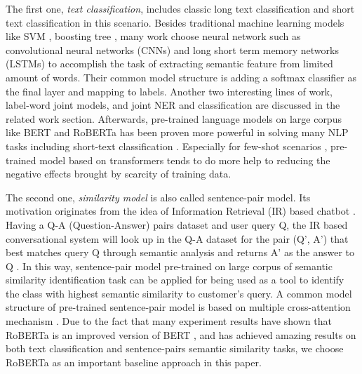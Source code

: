 The   first  one,  \emph{text  classification},  includes  classic  long  text
classification  and  short  text  classification  in  this  scenario.  Besides
traditional  machine  learning  models  like  SVM \cite{suykens1999least},  
boosting  tree \cite{tu2005probabilistic},  many work
\cite{wen2016network}  choose  neural  network  such  as  convolutional neural
networks (CNNs) \cite{kim2014convolutional,zhang2015character,conneau2016very}
and       long       short       term       memory       networks      (LSTMs)
\cite{mousa2017contextual,liu2016recurrent}   to   accomplish   the   task  of
extracting  semantic  feature from limited amount of words. Their common model
structure  is  adding  a  softmax classifier as the final layer and mapping to
labels.  Another  two  interesting lines of work, label-word joint models, and
joint  NER  and  classification  are  discussed  in  the related work section.
Afterwards,   pre-trained   language   models   on   large  corpus  like  BERT
\cite{devlin2018bert}  and  RoBERTa \cite{liu2019roberta} has been proven more
powerful  in  solving  many  NLP  tasks  including  short-text  classification
\cite{madabushi2020cost}.      Especially      for      few-shot     scenarios
\cite{yu2018diverse},     pre-trained     model    based    on    transformers
\cite{vaswani2017attention} tends to do more
help to reducing the negative effects brought by scarcity of training data.

The  second  one,  \emph{similarity model} is also called sentence-pair model.
Its  motivation  originates  from  the idea of Information Retrieval (IR) based
chatbot   \cite{jafarpour2010filter,   leuski2011npceditor}.   Having   a  Q-A
(Question-Answer)  pairs dataset and user query Q, the IR based conversational
system will look up in the Q-A dataset for the pair (Q', A') that best matches
query  Q  through  semantic  analysis  and  returns  A'  as  the  answer  to Q
\cite{mnasri2019recent}. In this way, sentence-pair model pre-trained on large
corpus  of  semantic  similarity  identification task can be applied for being
used  as  a  tool  to  identify  the class with highest semantic similarity to
customer's    query.    A    common    model    structure    of    pre-trained 
sentence-pair model is based on multiple cross-attention
mechanism  \cite{barkan2020scalable}. Due to
the   fact   that   many   experiment   results   have   shown   that  RoBERTa
\cite{liu2019roberta} is an improved version of BERT \cite{devlin2018bert}, and has achieved amazing
results  on  both  text  classification and sentence-pairs semantic similarity
tasks, we choose RoBERTa as an important baseline approach in this paper.

